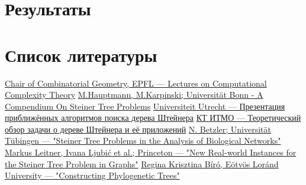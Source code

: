 \documentclass[11pt,a4paper]{report}
\theoremstyle{definition}
\theoremstyle{definition}
\theoremstyle{definition}
\begin{document}
	\section{Результаты}
	\section{Список литературы}
	\renewcommand\bibname{}
	\patchcmd{\thebibliography}{\chapter*}{\section*}{}{}
	\vspace*{-1cm}
	\begin{thebibliography}{}
		 \href{https://dcg.epfl.ch/wp-content/uploads/2018/10/9-NPHardness.pdf}{Chair of Combinatorial Geometry, EPFL — Lectures on Computational Complexity Theory}
		 \href{http://theory.cs.uni-bonn.de/info5/steinerkompendium/netcompendium.pdf}{M.Hauptmann, M.Karpinski; Universität Bonn - A Compendium On Steiner Tree Problems}
		 \href{http://www.cs.uu.nl/docs/vakken/an/teoud/an-steiner.ppt}{Universiteit Utrecht — Презентация приближённых алгоритмов поиска дерева Штейнера}
		\href{http://rain.ifmo.ru/cat/data/theory/unsorted/steiner-problem-2010/article.pdf}{КТ ИТМО — Теоретический обзор задачи о дереве Штейнера и её приложений}
		 \href{https://fpt.akt.tu-berlin.de/publications/steiner-tree-betzler06.pdf}{N. Betzler; Universität Tübingen — "Steiner Tree Problems in the Analysis of Biological Networks"}
		 \href{https://homepage.univie.ac.at/ivana.ljubic/research/STP/realworld-stp-report-short.pdf}{Markus Leitner, Ivana Ljubić et al.; Princeton — "New Real-world Instances for the Steiner Tree Problem in Graphs"}
		 \href{http://web.cs.elte.hu/~berkri/Theses/Biro.pdf }{Regina Krisztina Bíró, Eötvös Loránd University — "Constructing Phylogenetic Trees"}
	\end{thebibliography}
\end{document}
